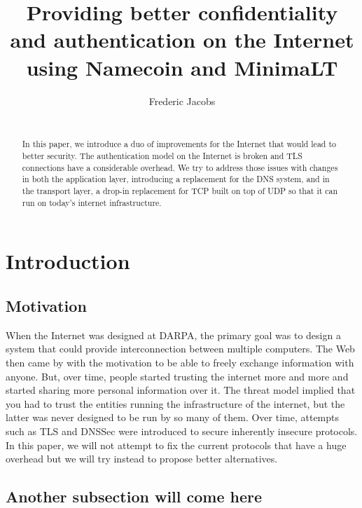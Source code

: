\documentclass{vldb}
\begin{document}
\title{Providing better confidentiality and authentication on the Internet using Namecoin and MinimaLT}

\author{
\alignauthor
Frederic Jacobs\\
\\
}

\maketitle

\begin{abstract}
In this paper, we introduce a duo of improvements for the Internet that would lead to better security. The authentication model on the Internet is broken and TLS connections have a considerable overhead. We try to address those issues with changes in both the application layer, introducing a replacement for the DNS system, and in the transport layer, a drop-in replacement for TCP built on top of UDP so that it can run on today's internet infrastructure.

\end{abstract}

\section{Introduction}

\subsection{Motivation}

When the Internet was designed at DARPA, the primary goal was to design a system that could provide interconnection between multiple computers. The Web then came by with the motivation to be able to freely exchange information with anyone. But, over time, people started trusting the internet more and more and started sharing more personal information over it. The threat model implied that you had to trust the entities running the infrastructure of the internet, but the latter was never designed to be run by so many of them. Over time, attempts such as TLS and DNSSec were introduced to secure inherently insecure protocols. In this paper, we will not attempt to fix the current protocols that have a huge overhead but we will try instead to propose better alternatives.

\subsection{Another subsection will come here}
\end{document}
